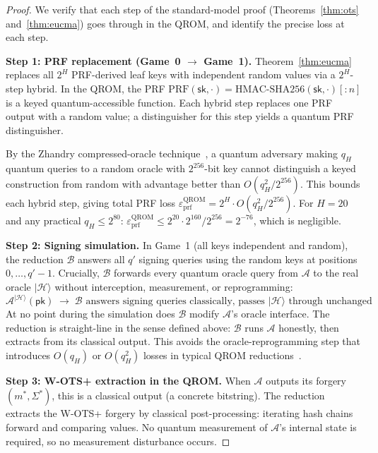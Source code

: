 \documentclass[11pt]{article}
\newcommand{\hash}{\mathcal{H}}
\newcommand{\prf}{\mathrm{PRF}}
\begin{document}
\begin{proof}
We verify that each step of the standard-model proof
(Theorems~\ref{thm:ots} and~\ref{thm:eucma}) goes through in the QROM,
and identify the precise loss at each step.

\textbf{Step 1: PRF replacement (Game~0 $\to$ Game~1).}
Theorem~\ref{thm:eucma} replaces all $2^H$ PRF-derived leaf keys with
independent random values via a $2^H$-step hybrid. In the QROM, the
PRF $\prf(\mathsf{sk}, \cdot) = \mathrm{HMAC}\text{-}\mathrm{SHA256}
(\mathsf{sk}, \cdot)[{:}n]$ is a keyed quantum-accessible function.
Each hybrid step replaces one PRF output with a random value; a
distinguisher for this step yields a quantum PRF distinguisher.

By the Zhandry compressed-oracle technique~\cite{zhandry}, a quantum
adversary making $q_H$ quantum queries to a random oracle with
$2^{256}$-bit key cannot distinguish a keyed construction from random
with advantage better than $O(q_H^2 / 2^{256})$. This bounds each
hybrid step, giving total PRF loss
$\varepsilon_{\mathrm{prf}}^{\mathrm{QROM}} =
2^H \cdot O(q_H^2 / 2^{256})$. For $H = 20$ and any practical $q_H
\leq 2^{80}$:
$\varepsilon_{\mathrm{prf}}^{\mathrm{QROM}} \leq
2^{20} \cdot 2^{160} / 2^{256} = 2^{-76}$, which is negligible.

\textbf{Step 2: Signing simulation.}
In Game~1 (all keys independent and random), the reduction
$\mathcal{B}$ answers all $q'$ signing queries using the random keys at
positions $0, \ldots, q' - 1$. Crucially, $\mathcal{B}$ forwards every
quantum oracle query from $\mathcal{A}$ to the real oracle
$|\hash\rangle$ without interception, measurement, or reprogramming:
\[
\mathcal{A}^{|\hash\rangle}(\mathsf{pk}) \;\longrightarrow\;
\mathcal{B}\text{ answers signing queries classically, passes }
|\hash\rangle\text{ through unchanged}
\]
At no point during the simulation does $\mathcal{B}$ modify
$\mathcal{A}$'s oracle interface. The reduction is straight-line in the
sense defined above: $\mathcal{B}$ runs $\mathcal{A}$ honestly, then
extracts from its classical output. This avoids the
oracle-reprogramming step that introduces $O(q_H)$ or $O(q_H^2)$
losses in typical QROM reductions~\cite{dongyanglong}.

\textbf{Step 3: W-OTS+ extraction in the QROM.}
When $\mathcal{A}$ outputs its forgery $(m^*, \Sigma^*)$, this is a
classical output (a concrete bitstring). The reduction extracts the
W-OTS+ forgery by classical post-processing: iterating hash chains
forward and comparing values. No quantum measurement of
$\mathcal{A}$'s internal state is required, so no measurement
disturbance occurs.


\end{proof}
\end{document}

